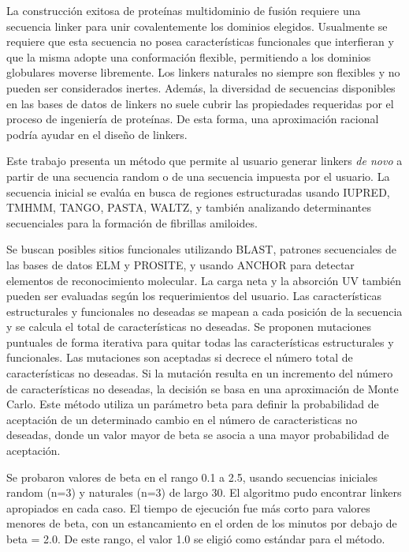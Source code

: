 

La construcción exitosa de proteínas multidominio de fusión requiere una secuencia linker para unir covalentemente los dominios elegidos.
Usualmente se requiere que esta secuencia no posea características funcionales que interfieran 
y que la misma adopte una conformación flexible, permitiendo a los dominios globulares moverse libremente.
Los linkers naturales no siempre son flexibles y no pueden ser considerados inertes. 
Además, la diversidad de secuencias disponibles en las bases de datos de linkers no suele cubrir las propiedades requeridas por el proceso de ingeniería de proteínas.
De esta forma, una aproximación racional podría ayudar en el diseño de linkers.



Este trabajo presenta un método que permite al usuario generar linkers \textit{de novo} a partir de una secuencia random o de una secuencia impuesta por el usuario.
La secuencia inicial se evalúa en busca de regiones estructuradas usando IUPRED, TMHMM, TANGO, PASTA, WALTZ, 
y también analizando determinantes secuenciales para la formación de fibrillas amiloides.


Se buscan posibles sitios funcionales utilizando BLAST, patrones secuenciales de las bases de datos ELM y PROSITE, y usando ANCHOR para detectar elementos de reconocimiento molecular.
La carga neta y la absorción UV también pueden ser evaluadas según los requerimientos del usuario.
Las características estructurales y funcionales no deseadas se mapean a cada posición de la secuencia y se calcula el total de características no deseadas.
Se proponen mutaciones puntuales de forma iterativa para quitar todas las características estructurales y funcionales.
Las mutaciones son aceptadas si decrece el número total de características no deseadas.
Si la mutación resulta en un incremento del número de características no deseadas, la decisión se basa en una aproximación de Monte Carlo.
Este método utiliza un parámetro beta para definir la probabilidad de aceptación de un determinado cambio en el número de caracteristicas no deseadas, 
donde un valor mayor de beta se asocia a una mayor probabilidad de aceptación.



Se probaron valores de beta en el rango 0.1 a 2.5, usando secuencias iniciales random (n=3) y naturales (n=3) de largo 30.
El algoritmo pudo encontrar linkers apropiados en cada caso. El tiempo de ejecución fue más corto para valores menores de beta,
con un estancamiento en el orden de los minutos por debajo de beta = 2.0.
De este rango, el valor 1.0 se eligió como estándar para el método.



